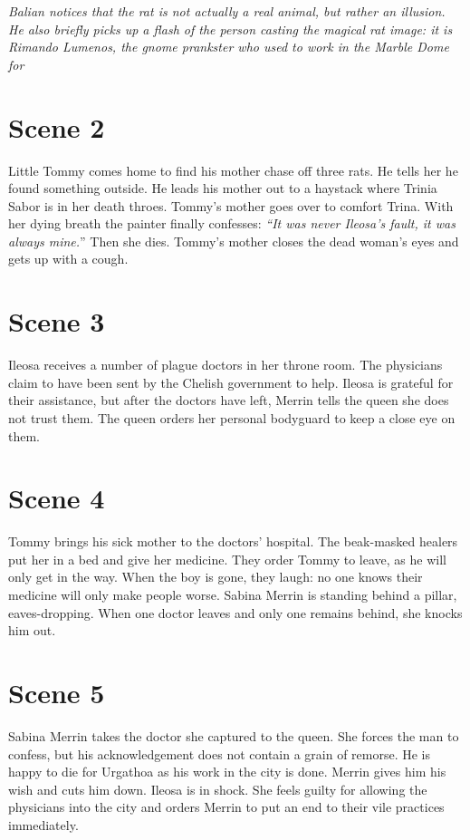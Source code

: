  {\itshape Balian notices that the rat is not actually a real animal, but rather an illusion. He also briefly picks up a flash of the person casting the magical rat image: it is Rimando Lumenos, the gnome prankster who used to work in the Marble Dome for}  \section{Scene 2}

Little Tommy comes home to find his mother chase off three rats. He tells her he found something outside. He leads his mother out to a haystack where Trinia Sabor is in her death throes. Tommy's mother goes over to comfort Trina. With her dying breath the painter finally confesses: {\itshape``It was never Ileosa's fault, it was always mine.}'' Then she dies. Tommy's mother closes the dead woman's eyes and gets up with a cough.\\

\section{Scene 3}

Ileosa receives a number of plague doctors in her throne room. The physicians claim to have been sent by the Chelish government to help. Ileosa is grateful for their assistance, but after the doctors have left, Merrin tells the queen she does not trust them. The queen orders her personal bodyguard to keep a close eye on them.\\

\section{Scene 4}

Tommy brings his sick mother to the doctors' hospital. The beak-masked healers put her in a bed and give her medicine. They order Tommy to leave, as he will only get in the way. When the boy is gone, they laugh: no one knows their medicine will only make people worse. Sabina Merrin is standing behind a pillar, eaves-dropping. When one doctor leaves and only one remains behind, she knocks him out.\\

\section{Scene 5}

Sabina Merrin takes the doctor she captured to the queen. She forces the man to confess, but his acknowledgement does not contain a grain of remorse. He is happy to die for Urgathoa as his work in the city is done. Merrin gives him his wish and cuts him down. Ileosa is in shock. She feels guilty for allowing the physicians into the city and orders Merrin to put an end to their vile practices immediately.\\

